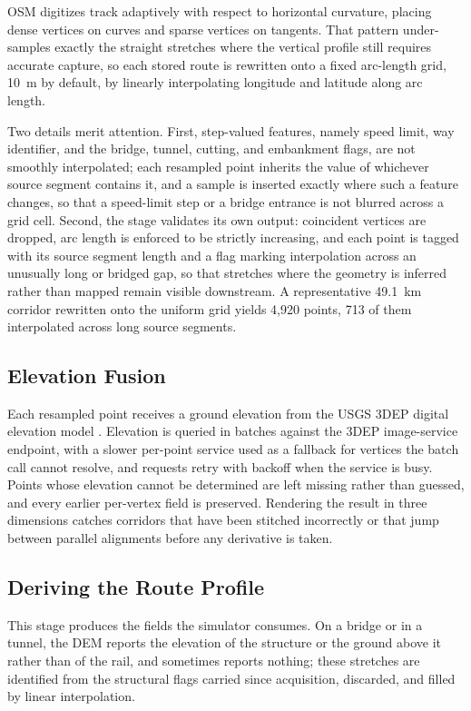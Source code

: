 \documentclass[numbered]{trbunofficial}
\begin{document}
OSM digitizes track adaptively with respect to horizontal curvature, placing dense vertices on curves and sparse vertices on tangents. That pattern under-samples exactly the straight stretches where the vertical profile still requires accurate capture, so each stored route is rewritten onto a fixed arc-length grid, 10~m by default, by linearly interpolating longitude and latitude along arc length.

Two details merit attention. First, step-valued features, namely speed limit, way identifier, and the bridge, tunnel, cutting, and embankment flags, are not smoothly interpolated; each resampled point inherits the value of whichever source segment contains it, and a sample is inserted exactly where such a feature changes, so that a speed-limit step or a bridge entrance is not blurred across a grid cell. Second, the stage validates its own output: coincident vertices are dropped, arc length is enforced to be strictly increasing, and each point is tagged with its source segment length and a flag marking interpolation across an unusually long or bridged gap, so that stretches where the geometry is inferred rather than mapped remain visible downstream. A representative 49.1~km corridor rewritten onto the uniform grid yields 4,920 points, 713 of them interpolated across long source segments.

\subsection{Elevation Fusion}

Each resampled point receives a ground elevation from the USGS 3DEP digital elevation model \citep{usgs3dep}. Elevation is queried in batches against the 3DEP image-service endpoint, with a slower per-point service used as a fallback for vertices the batch call cannot resolve, and requests retry with backoff when the service is busy. Points whose elevation cannot be determined are left missing rather than guessed, and every earlier per-vertex field is preserved. Rendering the result in three dimensions catches corridors that have been stitched incorrectly or that jump between parallel alignments before any derivative is taken.

\subsection{Deriving the Route Profile}

This stage produces the fields the simulator consumes. On a bridge or in a tunnel, the DEM reports the elevation of the structure or the ground above it rather than of the rail, and sometimes reports nothing; these stretches are identified from the structural flags carried since acquisition, discarded, and filled by linear interpolation.
\end{document}
